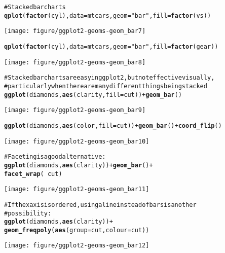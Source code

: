 \documentclass[a4paper,titlepage]{tufte-handout}\usepackage{graphicx, color}
\makeatletter
\def\maxwidth{ %
  \ifdim\Gin@nat@width>\linewidth
    \linewidth
  \else
    \Gin@nat@width
  \fi
}
\newcommand{\hlfunctioncall}[1]{\textcolor[rgb]{0.501960784313725,0,0.329411764705882}{\textbf{#1}}}%
\newcommand{\hlstring}[1]{\textcolor[rgb]{0.6,0.6,1}{#1}}%
\newcommand{\hlcomment}[1]{\textcolor[rgb]{0.180392156862745,0.6,0.341176470588235}{#1}}%
\newenvironment{kframe}{%
 \def\at@end@of@kframe{}%
 \ifinner\ifhmode%
  \def\at@end@of@kframe{\end{minipage}}%
  \begin{minipage}{\columnwidth}%
 \fi\fi%
 \def\FrameCommand##1{\hskip\@totalleftmargin \hskip-\fboxsep
 \colorbox{shadecolor}{##1}\hskip-\fboxsep
     \hskip-\linewidth \hskip-\@totalleftmargin \hskip\columnwidth}%
 \MakeFramed {\advance\hsize-\width
   \@totalleftmargin\z@ \linewidth\hsize
   \@setminipage}}%
 {\par\unskip\endMakeFramed%
 \at@end@of@kframe}
\newenvironment{knitrout}{}{} %
\makeatother
\begin{document}
\begin{knitrout}
\begin{kframe}
\begin{alltt}
\hlcomment{# Stacked bar charts}
\hlfunctioncall{qplot}(\hlfunctioncall{factor}(cyl), data=mtcars, geom=\hlstring{"bar"}, fill=\hlfunctioncall{factor}(vs))
\end{alltt}
\end{kframe}\texttt{[image: figure/ggplot2-geoms-geom\_bar7]} \begin{kframe}\begin{alltt}
\hlfunctioncall{qplot}(\hlfunctioncall{factor}(cyl), data=mtcars, geom=\hlstring{"bar"}, fill=\hlfunctioncall{factor}(gear))
\end{alltt}
\end{kframe}\texttt{[image: figure/ggplot2-geoms-geom\_bar8]} \begin{kframe}\begin{alltt}
\hlcomment{# Stacked bar charts are easy in ggplot2, but not effective visually,}
\hlcomment{# particularly when there are many different things being stacked}
\hlfunctioncall{ggplot}(diamonds, \hlfunctioncall{aes}(clarity, fill=cut)) + \hlfunctioncall{geom_bar}()
\end{alltt}
\end{kframe}\texttt{[image: figure/ggplot2-geoms-geom\_bar9]} \begin{kframe}\begin{alltt}
\hlfunctioncall{ggplot}(diamonds, \hlfunctioncall{aes}(color, fill=cut)) + \hlfunctioncall{geom_bar}() + \hlfunctioncall{coord_flip}()
\end{alltt}
\end{kframe}\texttt{[image: figure/ggplot2-geoms-geom\_bar10]} \begin{kframe}\begin{alltt}
\hlcomment{# Faceting is a good alternative:}
\hlfunctioncall{ggplot}(diamonds, \hlfunctioncall{aes}(clarity)) + \hlfunctioncall{geom_bar}() +
  \hlfunctioncall{facet_wrap}(~ cut)
\end{alltt}
\end{kframe}\texttt{[image: figure/ggplot2-geoms-geom\_bar11]} \begin{kframe}\begin{alltt}
\hlcomment{# If the x axis is ordered, using a line instead of bars is another}
\hlcomment{# possibility:}
\hlfunctioncall{ggplot}(diamonds, \hlfunctioncall{aes}(clarity)) +
  \hlfunctioncall{geom_freqpoly}(\hlfunctioncall{aes}(group = cut, colour = cut))
\end{alltt}
\end{kframe}\texttt{[image: figure/ggplot2-geoms-geom\_bar12]} \begin{kframe}\begin{alltt}

\end{alltt}
\end{kframe}
\end{knitrout}
\end{document}
